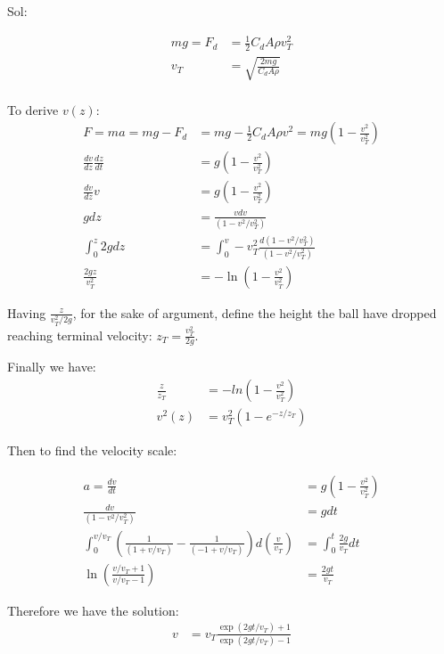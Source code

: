\documentclass[11pt, a4paper, oneside]{book}
\numberwithin{equation}{section}%
\begin{document}
Sol:

\begin{align}
	mg = F_d &= \frac{1}{2}C_dA\rho v_T^2\\
	v_T &= \sqrt{\frac{2mg}{C_d A \rho}}\\
\end{align}

To derive $ v(z) $:
\begin{align}
	F = ma = mg - F_d &= mg - \frac{1}{2}C_dA\rho v^2 = mg \left(1 - \frac{v^2}{v_T^2}\right)\\
	\frac{dv}{dz}\frac{dz}{dt} &= g (1 - \frac{v^2}{v_T^2})\\
	\frac{dv}{dz}v &= g \left(1 - \frac{v^2}{v_T^2}\right)\\
	gdz &= \frac{vdv}{(1 - v^2/v_T^2)}\\
	\int_{0}^{z}2gdz &= \int_{0}^{v}-v_T^2\frac{d(1 - v^2/v_T^2)}{(1 - v^2/v_T^2)}\\
	\frac{2gz}{v_T^2} &= -\ln\left(1 - \frac{v^2}{v_T^2}\right)
\end{align}

Having $\displaystyle{\frac{z}{v_T^2/2g}}$, for the sake of argument, define the height the ball have dropped reaching terminal velocity: $ \displaystyle{z_T = \frac{v_T^2}{2g}} $. 

Finally we have:
\begin{align}
	\frac{z}{z_T} &= -ln\left(1 - \frac{v^2}{v_T^2}\right)\\
	v^2(z) &= v_T^2(1 - e^{-z/z_T})
\end{align}

Then to find the velocity scale:
\begin{center}
	\begin{align}
	a = \frac{dv}{dt} &= g \left(1 - \frac{v^2}{v_T^2}\right)\\
	\frac{dv}{(1 - v^2/v_T^2)} &= gdt\\
	\int_{0}^{v/v_T}\left(\frac{1}{\left(1 + v/v_T\right)} - \frac{1}{\left(-1 + v/v_T\right)}\right)d\left(\frac{v}{v_T}\right) &= \int_{0}^{t}\frac{2g}{v_T}dt\\
	\ln\left(\frac{v/v_T + 1}{v/v_T - 1}\right) &= \frac{2gt}{v_T}
	\end{align}
\end{center}%

Therefore we have the solution:
\begin{align}
	v &= v_T\frac{\exp(2gt/v_T)+1}{\exp(2gt/v_T)-1}
\end{align}
\end{document}

